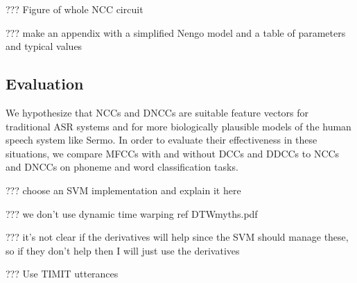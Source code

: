 ??? Figure of whole NCC circuit


??? make an appendix with a simplified Nengo model
and a table of parameters and typical values

\subsection{Evaluation}

We hypothesize that NCCs and DNCCs
are suitable feature vectors
for traditional ASR systems
and for more biologically plausible
models of the human speech system like Sermo.
In order to evaluate their effectiveness
in these situations,
we compare MFCCs with and without DCCs
and DDCCs to NCCs and DNCCs
on phoneme and word classification tasks.

??? choose an SVM implementation and
explain it here

??? we don't use dynamic time warping
ref DTWmyths.pdf

??? it's not clear if the derivatives will help
since the SVM should manage these,
so if they don't help then I will
just use the derivatives

??? Use TIMIT utterances





